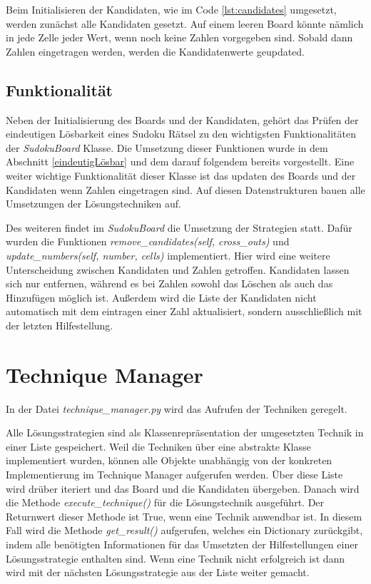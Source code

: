 Beim Initialisieren der Kandidaten, wie im Code \ref{lst:candidates} umgesetzt, werden zunächst alle Kandidaten gesetzt. Auf einem leeren Board könnte nämlich in jede Zelle jeder Wert, wenn noch keine Zahlen vorgegeben sind. Sobald dann Zahlen eingetragen werden, werden die Kandidatenwerte geupdated.

\subsection{Funktionalität}
Neben der Initialisierung des Boards und der Kandidaten, gehört das Prüfen der eindeutigen Lösbarkeit eines Sudoku Rätsel zu den wichtigsten Funktionalitäten der \textit{SudokuBoard} Klasse. Die Umsetzung dieser Funktionen wurde in dem Abschnitt \ref{eindeutigLösbar} und dem darauf folgendem bereits vorgestellt. Eine weiter wichtige Funktionalität dieser Klasse ist das updaten des Boards und der Kandidaten wenn Zahlen eingetragen sind. Auf diesen Datenstrukturen bauen alle Umsetzungen der Lösungstechniken auf. 

Des weiteren findet im \textit{SudokuBoard} die Umsetzung der Strategien statt. Dafür wurden die Funktionen \textit{remove\_candidates(self, cross\_outs)} und \textit{update\_numbers(self, number, cells)} implementiert. Hier wird eine weitere Unterscheidung zwischen Kandidaten und Zahlen getroffen. Kandidaten lassen sich nur entfernen, während es bei Zahlen sowohl das Löschen als auch das Hinzufügen möglich ist. Außerdem wird die Liste der Kandidaten nicht automatisch mit dem eintragen einer Zahl aktualisiert, sondern ausschließlich mit der letzten Hilfestellung.


\section{Technique Manager}

In der Datei \textit{technique\_manager.py} wird das Aufrufen der Techniken geregelt. 

Alle Lösungsstrategien sind als Klassenrepräsentation der umgesetzten Technik in einer Liste gespeichert. Weil die Techniken über eine abstrakte Klasse implementiert wurden, können alle Objekte unabhängig von der konkreten Implementierung im Technique Manager aufgerufen werden. Über diese Liste wird drüber iteriert und das Board und die Kandidaten übergeben. Danach wird die Methode \textit{execute\_technique()} für die Lösungstechnik ausgeführt. Der Returnwert dieser Methode ist True, wenn eine Technik anwendbar ist. In diesem Fall wird die Methode \textit{get\_result()} aufgerufen, welches ein Dictionary zurückgibt, indem alle benötigten Informationen für das Umsetzten der Hilfestellungen einer Lösungsstrategie enthalten sind.
Wenn eine Technik nicht erfolgreich ist dann wird mit der nächsten Lösungsstrategie aus der Liste weiter gemacht. 

